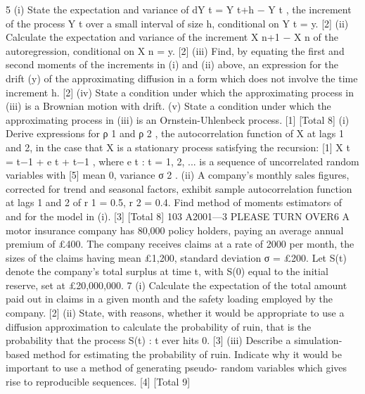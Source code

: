 \documentclass[a4paper,12pt]{article}
\begin{document}
\begin{enumerate}
5
(i) State the expectation and variance of dY t = Y t+h − Y t , the increment of the
process Y t over a small interval of size h, conditional on Y t = y.
[2]
(ii) Calculate the expectation and variance of the increment X n+1 − X n of the
autoregression, conditional on X n = y.
[2]
(iii) Find, by equating the first and second moments of the increments in (i)
and (ii) above, an expression for the drift \mu(y) of the approximating
diffusion in a form which does not involve the time increment h.
[2]
(iv) State a condition under which the approximating process in (iii) is a
Brownian motion with drift.
(v) State a condition under which the approximating process in (iii) is an
Ornstein-Uhlenbeck process.
[1]
[Total 8]
(i) Derive expressions for ρ 1 and ρ 2 , the autocorrelation function of X at lags
1 and 2, in the case that X is a stationary process satisfying the recursion:
[1]
X t = \alphaX t−1 + e t + \betae t−1 ,
where {e t : t = 1, 2, ...} is a sequence of uncorrelated random variables with
[5]
mean 0, variance σ 2 .
(ii)
A company’s monthly sales figures, corrected for trend and seasonal
factors, exhibit sample autocorrelation function at lags 1 and 2 of r 1 = 0.5,
r 2 = 0.4. Find method of moments estimators of \alpha and \beta for the model
in (i).
[3]
[Total 8]
103 A2001—3
PLEASE TURN OVER6
A motor insurance company has 80,000 policy holders, paying an average annual
premium of £400. The company receives claims at a rate of 2000 per month, the
sizes of the claims having mean £1,200, standard deviation σ = £200.
Let S(t) denote the company’s total surplus at time t, with S(0) equal to the
initial reserve, set at £20,000,000.
7
(i) Calculate the expectation of the total amount paid out in claims in a given
month and the safety loading employed by the company.
[2]
(ii) State, with reasons, whether it would be appropriate to use a diffusion
approximation to calculate the probability of ruin, that is the probability
that the process {S(t) : t } ever hits 0.
[3]
(iii) Describe a simulation-based method for estimating the probability of ruin.
Indicate why it would be important to use a method of generating pseudo-
random variables which gives rise to reproducible sequences.
[4]
[Total 9]


\end{enumerate}
\end{document}
